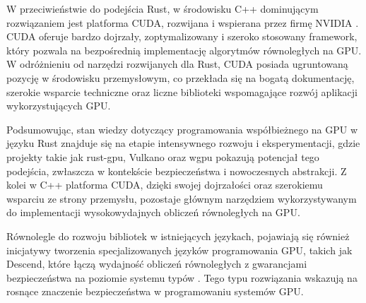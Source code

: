 W przeciwieństwie do podejścia Rust, w środowisku C++ dominującym rozwiązaniem jest platforma CUDA, rozwijana i wspierana przez firmę NVIDIA \cite{nvidiaCUDAToolkit}. CUDA oferuje bardzo dojrzały, zoptymalizowany i szeroko stosowany framework, który pozwala na bezpośrednią implementację algorytmów równoległych na GPU. W odróżnieniu od narzędzi rozwijanych dla Rust, CUDA posiada ugruntowaną pozycję w środowisku przemysłowym, co przekłada się na bogatą dokumentację, szerokie wsparcie techniczne oraz liczne biblioteki wspomagające rozwój aplikacji wykorzystujących GPU.

Podsumowując, stan wiedzy dotyczący programowania współbieżnego na GPU w języku Rust znajduje się na etapie intensywnego rozwoju i eksperymentacji, gdzie projekty takie jak rust-gpu, Vulkano oraz wgpu \cite{wgpuWgpuPortable} pokazują potencjał tego podejścia, zwłaszcza w kontekście bezpieczeństwa i nowoczesnych abstrakcji. Z kolei w C++ platforma CUDA, dzięki swojej dojrzałości oraz szerokiemu wsparciu ze strony przemysłu, pozostaje głównym narzędziem wykorzystywanym do implementacji wysokowydajnych obliczeń równoległych na GPU. 

Równolegle do rozwoju bibliotek w istniejących językach, pojawiają się również inicjatywy tworzenia specjalizowanych języków programowania GPU, takich jak Descend, które łączą wydajność obliczeń równoległych z gwarancjami bezpieczeństwa na poziomie systemu typów \cite{GPUSystemComapre}. Tego typu rozwiązania wskazują na rosnące znaczenie bezpieczeństwa w programowaniu systemów GPU.

